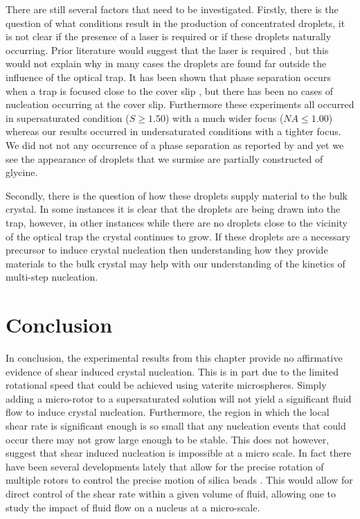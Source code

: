 There are still several factors that need to be investigated. 
Firstly, there is the question of what conditions result in the 
production of concentrated droplets, it is not clear if the 
presence of a laser is required or if these droplets naturally 
occurring. Prior literature would suggest that the laser is 
required \cite{Liao2022, Tsuboi2009}, but this would not explain 
why in many cases the droplets are found far outside the influence 
of the optical trap. It has been shown that phase separation 
occurs when a trap is focused close to the cover slip 
\cite{Gowayed2021, Yuyama2010, Yuyama2012}, but there has been 
no cases of nucleation occurring at the cover slip. Furthermore
these experiments all occurred in supersaturated condition 
($S\ge 1.50$) with a much wider focus ($NA \le 1.00$) whereas 
our results occurred in undersaturated conditions with a 
tighter focus. We did not not any occurrence of a phase 
separation as reported by \cite{Gowayed2021, Yuyama2010, Yuyama2012}
and yet we see the appearance of droplets that we surmise 
are partially constructed of glycine.

Secondly, there is the question of how these droplets supply 
material to the bulk crystal. In some instances it is clear 
that the droplets are being drawn into the trap, however, in 
other instances while there are no droplets close to the 
vicinity of the optical trap the crystal continues to grow. 
If these droplets are a necessary precursor to induce crystal 
nucleation then understanding how they provide materials to 
the bulk crystal may help with our understanding of the 
kinetics of multi-step nucleation. 

\section{Conclusion}
In conclusion, the experimental results from this chapter 
provide no affirmative evidence of shear induced crystal 
nucleation. This is in part due to the limited rotational 
speed that could be achieved using vaterite microspheres. 
Simply adding a micro-rotor to a supersaturated solution 
will not yield a significant fluid flow to induce crystal 
nucleation. Furthermore, the region in which the local 
shear rate is significant enough is so small that any 
nucleation events that could occur there may not grow large 
enough to be stable. This does not however, suggest that 
shear induced nucleation is impossible at a micro scale. 
In fact there have been several developments lately that
allow for the precise rotation of multiple rotors to 
control the precise motion of silica beads \cite{Butaite2019}. 
This would allow for direct control of the shear rate 
within a given volume of fluid, allowing one to study the 
impact of fluid flow on a nucleus at a micro-scale.

